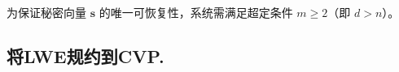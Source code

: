 \documentclass[12pt,a4paper]{article}
\numberwithin{equation}{section}
\begin{document}
为保证秘密向量 $\mathbf{s}$ 的唯一可恢复性，系统需满足超定条件 $m \geq 2$（即 $d > n$）。


\subsection{将LWE规约到CVP.} 






\end{document}
